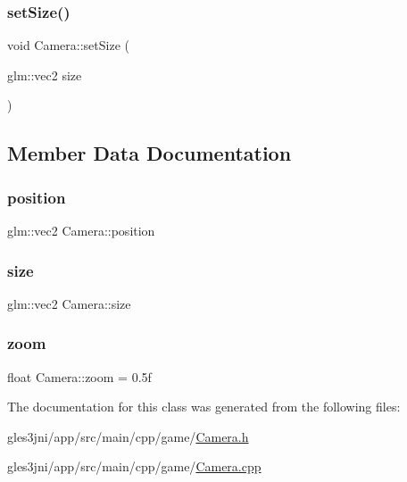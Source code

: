 \mbox{\label{class_camera_af755aa66130cb97058a7b0a9558ea06a}} 
\subsubsection{\texorpdfstring{set\+Size()}{setSize()}}
{\footnotesize\ttfamily void Camera\+::set\+Size (\begin{DoxyParamCaption}\item[{glm\+::vec2}]{size }\end{DoxyParamCaption})\hspace{0.3cm}{\ttfamily [inline]}}



\subsection{Member Data Documentation}
\mbox{\label{class_camera_ab1427fe342c2a550b5eea064311cc473}} 
\subsubsection{\texorpdfstring{position}{position}}
{\footnotesize\ttfamily glm\+::vec2 Camera\+::position\hspace{0.3cm}{\ttfamily [private]}}

\mbox{\label{class_camera_a54d49644a8999ae4cb1c9f824091c4d1}} 
\subsubsection{\texorpdfstring{size}{size}}
{\footnotesize\ttfamily glm\+::vec2 Camera\+::size\hspace{0.3cm}{\ttfamily [private]}}

\mbox{\label{class_camera_a21fc9e142b104d8e94126657abaa075f}} 
\subsubsection{\texorpdfstring{zoom}{zoom}}
{\footnotesize\ttfamily float Camera\+::zoom = 0.\+5f\hspace{0.3cm}{\ttfamily [private]}}



The documentation for this class was generated from the following files\+:\begin{DoxyCompactItemize}
\item 
gles3jni/app/src/main/cpp/game/\hyperlink{_camera_8h}{Camera.\+h}\item 
gles3jni/app/src/main/cpp/game/\hyperlink{_camera_8cpp}{Camera.\+cpp}\end{DoxyCompactItemize}
